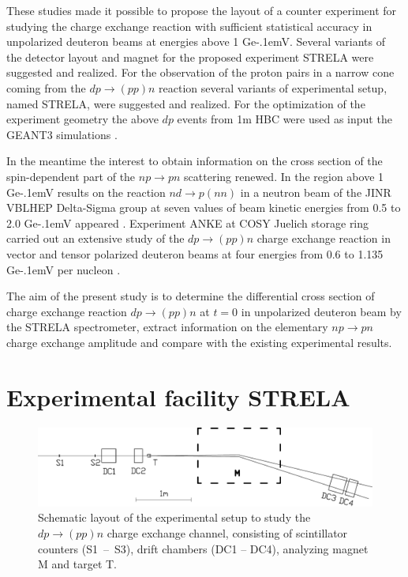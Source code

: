 \documentclass[twocolumn,epjc3]{svjour3}
\newcommand{\np}     {\ensuremath{np \rightarrow pn}\xspace}
\newcommand{\dpchex} {\ensuremath{dp \rightarrow (pp)n}\xspace}
\newcommand{\GeV}    {Ge\kern-.1emV\xspace}
\begin{document}
These studies made it possible to propose the layout of a counter experiment for
studying the charge exchange reaction with sufficient statistical accuracy in
unpolarized deuteron beams at energies above 1 \GeV. Several variants of the
detector layout and magnet for the proposed experiment STRELA were suggested and
realized. For the observation of the proton pairs in a narrow cone coming from
the \dpchex reaction several variants of experimental setup, named STRELA,
were suggested and realized. For the optimization of the experiment geometry the
above $dp$ events from 1m HBC were used as input the GEANT3 simulations
\cite{gla13}.

In the meantime the interest to obtain information on the cross section of the
spin-dependent part of the \np scattering renewed. In the region above 1 \GeV
results on the reaction $nd \rightarrow p(nn)$ in a neutron beam of the JINR
VBLHEP Delta-Sigma group at seven values of beam kinetic energies from 0.5 to
2.0 \GeV appeared \cite{sha09,sha09_2,shi11}. Experiment ANKE at COSY Juelich
storage ring carried out an extensive study of the \dpchex charge exchange
reaction in vector and tensor polarized deuteron beams at four energies from 0.6
to 1.135 \GeV per nucleon \cite{chi09,mch13}.

The aim of the present study is to determine the differential cross section of
charge exchange reaction \dpchex at $t = 0$ in unpolarized deuteron beam by the
STRELA spectrometer, extract information on the elementary \np charge exchange
amplitude and compare with the existing experimental results.

\section{Experimental facility STRELA}

\begin{figure}[t] %
  \centering
  \includegraphics[width=1.00\textwidth]{STRELA_layout.pdf}
  \caption{Schematic layout of the experimental setup to study the \dpchex
    charge exchange channel, consisting of scintillator counters (S1~--~S3),
    drift chambers (DC1 -- DC4), analyzing magnet M and target T.}
  \label{fig:STRELA_layout}
\end{figure}
\end{document}
